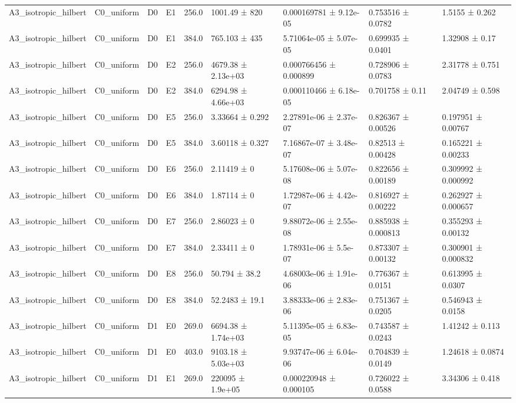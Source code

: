 \begin{table}
\begin{tabular}{lllllllll}
A3\_isotropic\_hilbert & C0\_uniform & D0 & E1 & 256.0 & 1001.49 ± 820 & 0.000169781 ± 9.12e-05 & 0.753516 ± 0.0782 & 1.5155 ± 0.262 \\
A3\_isotropic\_hilbert & C0\_uniform & D0 & E1 & 384.0 & 765.103 ± 435 & 5.71064e-05 ± 5.07e-05 & 0.699935 ± 0.0401 & 1.32908 ± 0.17 \\
A3\_isotropic\_hilbert & C0\_uniform & D0 & E2 & 256.0 & 4679.38 ± 2.13e+03 & 0.000766456 ± 0.000899 & 0.728906 ± 0.0783 & 2.31778 ± 0.751 \\
A3\_isotropic\_hilbert & C0\_uniform & D0 & E2 & 384.0 & 6294.98 ± 4.66e+03 & 0.000110466 ± 6.18e-05 & 0.701758 ± 0.11 & 2.04749 ± 0.598 \\
A3\_isotropic\_hilbert & C0\_uniform & D0 & E5 & 256.0 & 3.33664 ± 0.292 & 2.27891e-06 ± 2.37e-07 & 0.826367 ± 0.00526 & 0.197951 ± 0.00767 \\
A3\_isotropic\_hilbert & C0\_uniform & D0 & E5 & 384.0 & 3.60118 ± 0.327 & 7.16867e-07 ± 3.48e-07 & 0.82513 ± 0.00428 & 0.165221 ± 0.00233 \\
A3\_isotropic\_hilbert & C0\_uniform & D0 & E6 & 256.0 & 2.11419 ± 0 & 5.17608e-06 ± 5.07e-08 & 0.822656 ± 0.00189 & 0.309992 ± 0.000992 \\
A3\_isotropic\_hilbert & C0\_uniform & D0 & E6 & 384.0 & 1.87114 ± 0 & 1.72987e-06 ± 4.42e-07 & 0.816927 ± 0.00222 & 0.262927 ± 0.000657 \\
A3\_isotropic\_hilbert & C0\_uniform & D0 & E7 & 256.0 & 2.86023 ± 0 & 9.88072e-06 ± 2.55e-08 & 0.885938 ± 0.000813 & 0.355293 ± 0.00132 \\
A3\_isotropic\_hilbert & C0\_uniform & D0 & E7 & 384.0 & 2.33411 ± 0 & 1.78931e-06 ± 5.5e-07 & 0.873307 ± 0.00132 & 0.300901 ± 0.000832 \\
A3\_isotropic\_hilbert & C0\_uniform & D0 & E8 & 256.0 & 50.794 ± 38.2 & 4.68003e-06 ± 1.91e-06 & 0.776367 ± 0.0151 & 0.613995 ± 0.0307 \\
A3\_isotropic\_hilbert & C0\_uniform & D0 & E8 & 384.0 & 52.2483 ± 19.1 & 3.88333e-06 ± 2.83e-06 & 0.751367 ± 0.0205 & 0.546943 ± 0.0158 \\
A3\_isotropic\_hilbert & C0\_uniform & D1 & E0 & 269.0 & 6694.38 ± 1.74e+03 & 5.11395e-05 ± 6.83e-05 & 0.743587 ± 0.0243 & 1.41242 ± 0.113 \\
A3\_isotropic\_hilbert & C0\_uniform & D1 & E0 & 403.0 & 9103.18 ± 5.03e+03 & 9.93747e-06 ± 6.04e-06 & 0.704839 ± 0.0149 & 1.24618 ± 0.0874 \\
A3\_isotropic\_hilbert & C0\_uniform & D1 & E1 & 269.0 & 220095 ± 1.9e+05 & 0.000220948 ± 0.000105 & 0.726022 ± 0.0588 & 3.34306 ± 0.418 \\

\end{tabular}
\end{table}
